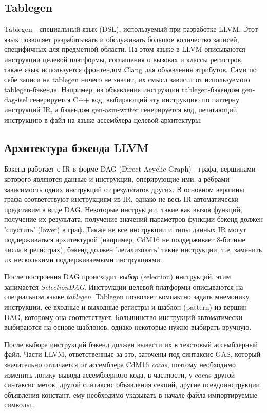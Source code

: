 \documentclass[a4paper,14pt]{extarticle}
\begin{document}
\subsection{Tablegen}
Tablegen - специальный язык (DSL), используемый при разработке LLVM. Этот язык позволяет разрабатывать и обслуживать большое количество записей, специфичных для предметной области. На этом языке в LLVM описываются инструкции целевой платформы, соглашения о вызовах и классы регистров, также язык используется фронтендом Clang для объявления атрибутов. Сами по себе записи на tablegen ничего не значит, их смысл зависит от используемого tablegen-бэкенда. Например, из объявления инструкции tablegen-бэкендом gen-dag-isel генерируется C++ код, выбирающий эту инструкцию по паттерну инструкций IR, а бэкендом gen-asm-writer генерируется код, печатающий инструкцию в файл на языке ассемблера целевой архитектуры\cite{llvm:tablegen}.

\subsection{Архитектура бэкенда LLVM}

Бэкенд работает с IR в форме DAG (Direct Acyclic Graph) - графа, вершинами которого являются данные и инструкции, оперирующие  ими, а рёбрами - зависимость одних инструкций от результатов других. В основном вершины графа соответствуют инструкциям из IR, однако не весь IR автоматически представим в виде DAG. Некоторые инструкции, такие как вызов функций, получение их результата, получение значений параметров функции бэкенд должен 'спустить' (lower) в граф. Также не все инструкции и типы данных IR могут поддерживаться архитектурой (например, CdM16 не поддерживает 8-битные числа в регистрах), бэкенд должен 'легализовать' такие инструкции, т.е. заменить их несколькими поддерживаемыми инструкциями.

После построения DAG происходит \emph{выбор} (selection) инструкций, этим занимается \emph{SelectionDAG}. Инструкции целевой платформы описываются на специальном языке \emph{tablegen}. Tablegen позволяет компактно задать мнемонику инструкции, её входные и выходные регистры и шаблон (pattern) из вершин DAG, которому она соответствует. Большинство инструкций автоматически выбираются на основе шаблонов, однако некоторые нужно выбирать вручную.

После выбора инструкций бэкенд должен вывести их в текстовый ассемблерный файл. Части LLVM, ответственные за это, заточены под синтаксис GAS, который значительно отличается от ассемблера CdM16 \emph{cocas}, поэтому  необходимо изменить логику вывода ассемблерного кода, в частности, у cocas другой синтаксис меток,  другой синтаксис объявления секций, другие псевдоинструкции объявления констант,  ему необходимо указывать в начале файла импортируемые символы,.
\end{document}
